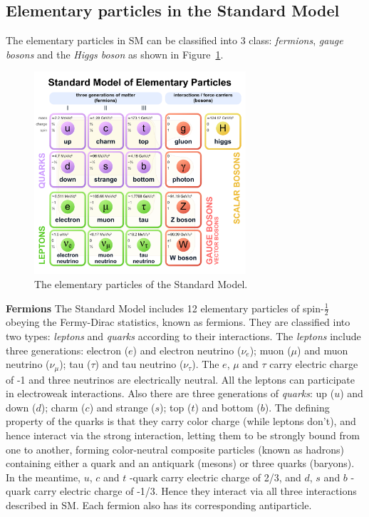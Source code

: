 \subsection{Elementary particles in the Standard Model}
\label{elementaryparticles}

The elementary particles in SM can be classified into 3 class: \textit{fermions}, \textit{gauge bosons} and the \textit{Higgs boson} as shown in Figure~\ref{fig:eleP-1}.
\begin{figure}[!htb]
  \centering
  \includegraphics[width=0.7\textwidth]{figures/Theory/Standard_Model_of_Elementary_Particles.pdf}
  \caption{The elementary particles of the Standard Model.}
  \label{fig:eleP-1}
\end{figure}

\textbf{Fermions}
The Standard Model includes 12 elementary particles of spin-$\frac{1}{2}$ obeying the Fermy-Dirac statistics, known as fermions. 
They are classified into two types: \textit{leptons} and \textit{quarks} according to their interactions.
The \textit{leptons} include three generations: electron ($e$) and electron neutrino ($\nu_{e}$); 
muon ($\mu$) and muon neutrino ($\nu_{\mu}$); tau ($\tau$) and tau neutrino ($\nu_{\tau}$).
The $e$, $\mu$ and $\tau$ carry electric charge of -1 and three neutrinos are electrically neutral. 
All the leptons can participate in electroweak interactions.
Also there are three generations of \textit{quarks}: up ($u$) and down ($d$); charm ($c$) and strange ($s$); top ($t$) and bottom ($b$).
The defining property of the quarks is that they carry color charge (while leptons don't), and hence interact via the strong interaction, 
letting them to be strongly bound from one to another, forming color-neutral composite 
particles (known as hadrons) containing either a quark and an antiquark (mesons) or three quarks (baryons).
In the meantime, $u$, $c$ and $t$ -quark carry electric charge of 2/3, and $d$, $s$ and $b$ -quark carry electric charge of -1/3. 
Hence they interact via all three interactions described in SM.
Each fermion also has its corresponding antiparticle.

